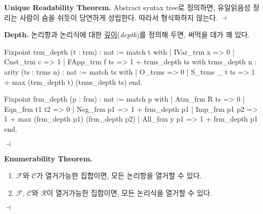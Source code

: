 \documentclass[12pt]{paper}
\newenvironment{context}[1][]
{ \noindent \textbf{{#1}.} }
{ \hfill $ \dashv $ }
\begin{document}
\newpage

\begin{context}[Unique Readability Theorem]
Abstract syntax tree로 정의하면, 유일읽음성 정리는 사람이 숨을 쉬듯이 당연하게 성립한다.
따라서 형식화하지 않는다.
\end{context}

\begin{context}[Depth]
논리항과 논리식에 대한 \underline{깊이}(\textit{depth})를 정의해 두면, 써먹을 데가 꽤 있다.
\begin{coqcode}
Fixpoint trm_depth (t : trm) : nat :=
  match t with
  | IVar_trm x => 0
  | Cnst_trm c => 1
  | FApp_trm f ts => 1 + trms_depth ts
with trms_depth {n : arity} (ts : trms n) : nat :=
  match ts with
  | O_trms => 0
  | S_trms _ t ts => 1 + max (trm_depth t) (trms_depth ts)
  end.

Fixpoint frm_depth (p : frm) : nat :=
  match p with
  | Atm_frm R ts => 0
  | Eqn_frm t1 t2 => 0
  | Neg_frm p1 => 1 + frm_depth p1
  | Imp_frm p1 p2 => 1 + max (frm_depth p1) (frm_depth p2)
  | All_frm y p1 => 1 + frm_depth p1
  end.
\end{coqcode}
\end{context}

\begin{context}[Enumerability Theorem]
\begin{enumerate}
\item $\mathcal{F}$와 $\mathcal{C}$가 열거가능한 집합이면, 모든 논리항을 열거할 수 있다.
\item $\mathcal{F}$, $\mathcal{C}$와 $\mathcal{R}$이 열거가능한 집합이면, 모든 논리식을 열거할 수 있다.
\end{enumerate}
\end{context}
\end{document}
